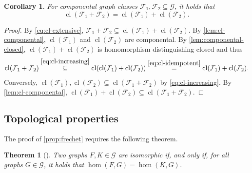 \documentclass[11pt]{scrartcl}
\theoremstyle{definition}
\theoremstyle{plain}
\newtheorem{corollary}[definition]{Corollary}
\newtheorem{theorem}[definition]{Theorem}
\theoremstyle{remark}
\DeclareMathOperator{\cl}{cl}
\newcommand{\G}{\mathcal{G}}
\begin{document}
	\begin{corollary}\label{cor:componental-closure}
		For componental graph classes $\mathcal{F}_1, \mathcal{F}_2 \subseteq \G$, it holds that
		\[ \cl(\mathcal{F}_1 + \mathcal{F}_2) = \cl(\mathcal{F}_1) + \cl(\mathcal{F}_2).\]
	\end{corollary}
	\begin{proof}
		By \eqref{eq:cl-extensive}, $\mathcal{F}_1 + \mathcal{F}_2 \subseteq \cl(\mathcal{F}_1) + \cl(\mathcal{F}_2)$.
		By \cref{lem:cl-componental}, $\cl(\mathcal{F}_1)$ and $\cl(\mathcal{F}_2)$ are componental.
		By \cref{lem:componental-closed}, $\cl(\mathcal{F}_1) + \cl(\mathcal{F}_2)$ is homomorphism distinguishing closed
		and thus 
        \[
            \cl(\mathcal{F}_1 + \mathcal{F}_2)  
            \overset{\eqref{eq:cl-increasing}}{\subseteq }\cl(\cl(\mathcal{F}_1) + \cl(\mathcal{F}_2))
            \overset{\eqref{eq:cl-idempotent}}{=} \cl(\mathcal{F}_1) + \cl(\mathcal{F}_2).
        \]
		Conversely, $\cl(\mathcal{F}_1), \cl(\mathcal{F}_2) \subseteq \cl(\mathcal{F}_1 + \mathcal{F}_2)$ by \eqref{eq:cl-increasing}.
		By \cref{lem:cl-componental},
		$\cl(\mathcal{F}_1) + \cl(\mathcal{F}_2) \subseteq \cl(\mathcal{F}_1 + \mathcal{F}_2)$.
	\end{proof}

    \subsection{Topological properties}

    \propFrechet*

    The proof of \cref{prop:frechet} requires the following theorem.

    \begin{theorem}[\textcite{lovasz_operations_1967,chaudhuri_optimization_1993}]\label{thm:dual-lovasz}
        Two graphs $F, K \in \G$ are isomorphic if, and only if,  for all graphs $G \in \G$, it holds that $\hom(F, G) = \hom(K,G)$.       
    \end{theorem}
\end{document}
